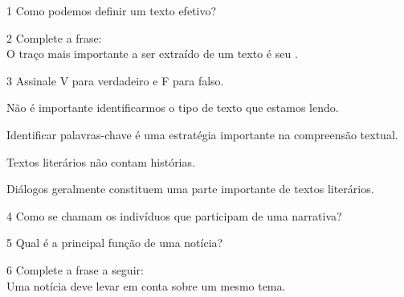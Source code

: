 
\num{1} Como podemos definir um texto efetivo?



\num{2} Complete a frase:\\
O traço mais importante a ser extraído de um texto é seu \preencher.



\num{3} Assinale V para verdadeiro e F para falso.

\begin{boxlist}
\item Não é importante identificarmos o tipo de texto que estamos lendo. 

\item Identificar palavras-chave é uma estratégia importante na
compreensão textual. 

\item Textos literários não contam histórias. 

\item Diálogos geralmente constituem uma parte importante de textos
literários. 
\end{boxlist}

\num{4} Como se chamam os indivíduos que participam de uma narrativa?



\num{5} Qual é a principal função de uma notícia?



\num{6} Complete a frase a seguir:\\
Uma notícia deve levar em conta \preencher sobre um mesmo tema.



